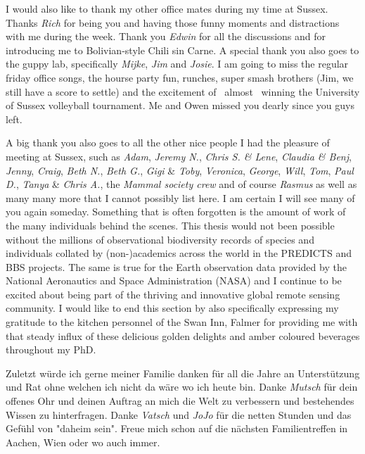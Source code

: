 I would also like to thank my other office mates during my time at Sussex. Thanks \textit{Rich} for being you and having those funny moments and distractions with me during the week. Thank you \textit{Edwin} for all the discussions and for introducing me to Bolivian-style Chili sin Carne. A special thank you also goes to the guppy lab, specifically \textit{Mijke}, \textit{Jim} and \textit{Josie}. I am going to miss the regular friday office songs, the hourse party fun, runches, super smash brothers (Jim, we still have a score to settle) and the excitement of \textendash\ almost \textendash\ winning the University of Sussex volleyball tournament. Me and Owen missed you dearly since you guys left.

A big thank you also goes to all the other nice people I had the pleasure of meeting at Sussex, such as \textit{Adam}, \textit{Jeremy N.}, \textit{Chris S. \& Lene}, \textit{Claudia \& Benj}, \textit{Jenny}, \textit{Craig}, \textit{Beth N.}, \textit{Beth G.}, \textit{Gigi} \& \textit{Toby}, \textit{Veronica}, \textit{George}, \textit{Will}, \textit{Tom}, \textit{Paul D.}, \textit{Tanya} \& \textit{Chris A.}, the \textit{Mammal society crew} and of course \textit{Rasmus} as well as many many more that I cannot possibly list here. I am certain I will see many of you again someday. Something that is often forgotten is the amount of work of the many individuals behind the scenes. This thesis would not been possible without the millions of observational biodiversity records of species and individuals collated by (non-)academics across the world in the PREDICTS and BBS projects. The same is true for the Earth observation data provided by the National Aeronautics and Space Administration (NASA) and I continue to be excited about being part of the thriving and innovative global remote sensing community. I would like to end this section by also specifically expressing my gratitude to the kitchen personnel of the Swan Inn, Falmer for providing me with that steady influx of these delicious golden delights and amber coloured beverages throughout my PhD. 

Zuletzt w\"{u}rde ich gerne meiner Familie danken für all die Jahre an Unterstützung und Rat ohne welchen ich nicht da w\"{a}re wo ich heute bin. Danke \textit{Mutsch} f\"{u}r dein offenes Ohr und deinen Auftrag an mich die Welt zu verbessern und bestehendes Wissen zu hinterfragen. Danke \textit{Vatsch} und \textit{JoJo} f\"{u}r die netten Stunden und das Gef\"{u}hl von "daheim sein". Freue mich schon auf die n\"{a}chsten Familientreffen in Aachen, Wien oder wo auch immer. 
